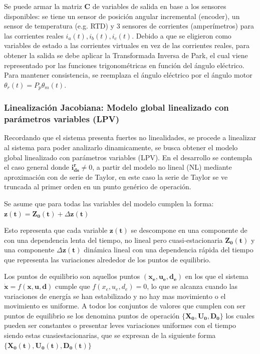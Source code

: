 \documentclass[blue,fullpaper]{ludusofficial}  %
\begin{document}
Se puede armar la matriz $\mathbf{C}$ de variables de salida en base a los sensores disponibles: se tiene un sensor de posición angular incremental (encoder), un sensor de temperatura (e.g. RTD) y 3 sensores de corrientes (amperímetros) para las corrientes reales $i_{a}(t), i_{b}(t), i_{c}(t)$. Debido a que se eligieron como variables de estado a las corrientes virtuales en vez de las corrientes reales, para obtener la salida se debe aplicar la Transformada Inversa de Park, el cual viene representado por las funciones trigonométricas en función del ángulo eléctrico. Para mantener consistencia, se reemplaza el ángulo eléctrico por el ángulo motor $\theta_{r}(t) = P_{p} \theta_{m}(t)$.

\subsubsection{Linealización Jacobiana: Modelo global linealizado con parámetros variables (LPV)}
Recordando que el sistema presenta fuertes no linealidades, se procede a linealizar al sistema para poder analizarlo dinamicamente, se busca obtener el modelo global linealizado con parámetros variables (LPV). En el desarrollo se contempla el caso general donde $\mathbf{i_{ds}^{r}}\neq0$, a partir del modelo no lineal (NL) mediante aproximación con de serie de Taylor, en este caso la serie de Taylor se ve truncada al primer orden en un punto genérico de operación.  

Se asume que para todas las variables del modelo cumplen la forma: 
$\mathbf{z(t)}=\mathbf{Z_0(t)}+\Delta\mathbf{z(t)}$ 

Esto representa que cada variable $\mathbf{z(t)}$ se descompone en una componente de con una dependencia lenta del tiempo, no lineal pero cuasi-estacionaria  $\mathbf{Z_0(t)}$ y una componente $\Delta\mathbf{z(t)}$ dinámica lineal con una dependencia rápida del tiempo que representa las variaciones alrededor de los puntos de equilibrio.

Los puntos de equilibrio son aquellos puntos $\mathbf{(x_e, u_e,d_e)}$ en los que el sistema $\dot{\mathbf{x}}= f (\mathbf{x}, \mathbf{u}, \mathbf{d})$ cumple que $f(x_e,u_e,d_e)=0 $, lo que se alcanza cuando las variaciones de energía se han estabilizado y no hay mas movimiento o el movimiento es uniforme.
A todos los conjuntos de valores que cumplen con ser puntos de equilibrio se los denomina puntos de operación $\mathbf{\{X_0, U_0,D_0}\}$ los cuales pueden ser constantes o presentar leves variaciones uniformes con el tiempo siendo estas cuasiestacionarias, que se expresan de la siguiente forma $\mathbf{\{X_0(t), U_0(t),D_0(t)\}}$
\end{document}
